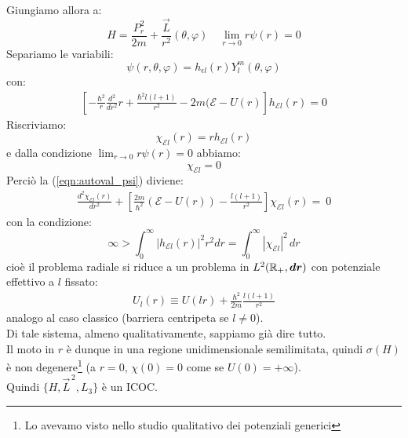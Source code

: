 \documentclass[../../FisicaTeorica.tex]{subfiles}
\begin{document}
Giungiamo allora a:
\[
H = \frac{P_r^2}{2m} + \frac{\vec{L}}{r^2} (\theta,\varphi)\quad \lim_{r\to 0} r\psi(r) = 0
\]
Separiamo le variabili:
\[
\psi(r,\theta,\varphi) = h_{\epsilon l}(r) Y^m_l(\theta,\varphi)
\]
con:
\begin{align}
\left[ - \frac{\hbar^2}{r}\frac{d^2}{dr^2} r + \frac{\hbar^2 l (l+1)}{r^2}-2m(\mathcal{E}-U(r)\right] h_{\mathcal{E}l}(r) = 0
\label{eqn:autoval_psi}
\end{align}
Riscriviamo:
\[
\chi_{\mathcal{E}l}(r) = rh_{\mathcal{E}l}(r)
\]
e dalla condizione $\lim_{r\to 0}r \psi(r) = 0$ abbiamo:
\[
\chi_{\mathcal{E} l } = 0
\]
Perciò la (\ref{eqn:autoval_psi}) diviene:
\begin{align}
\frac{d^2 \chi_{\mathcal{E}l}(r)}{dr^2} + \left[
\frac{2m}{\hbar^2}(\mathcal{E}-U(r)) - \frac{l(l+1)}{r^2}\right] \chi_{\mathcal{E}l}(r) =\ 0
\label{eqn:equazione_radiale}
\end{align}
con la condizione:
\[
\infty > \int_0^\infty |h_{\mathcal{E}l}(r)|^2 r^2 dr =\int_0^\infty |\chi_{\mathcal{E}l}|^2\,dr
\]
cioè il problema radiale si riduce a un problema in $L^2(\mathbb{R}_+, \bm{dr})$ con potenziale effettivo a $l$ fissato:
\begin{align*}
U_l(r) \equiv U(lr) + \frac{\hbar^2}{2m}\frac{l(l+1)}{r^2}
\end{align*}
analogo al caso classico (barriera centripeta se $l\neq 0$).\\
Di tale sistema, almeno qualitativamente, sappiamo già dire tutto.\\
Il moto in $r$ è dunque in una regione unidimensionale semilimitata, quindi $\sigma(H)$ è non degenere\footnote{Lo avevamo visto nello studio qualitativo dei potenziali generici} (a $r=0$, $\chi(0)=0$ come se $U(0)=+\infty$).\\
Quindi $\{H, \vec{L}^{\,2},L_3\}$ è un ICOC.\\
\end{document}
